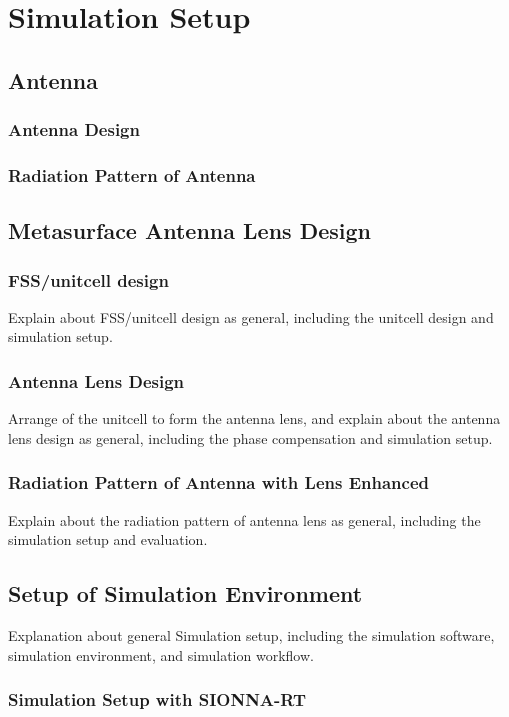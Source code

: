 \chapter{Simulation Setup}
\section{Antenna}
\subsection{Antenna Design}
\subsection{Radiation Pattern of Antenna}

\section{Metasurface Antenna Lens Design}
\subsection{FSS/unitcell design}
    Explain about FSS/unitcell design as general, including the unitcell design and simulation setup.
\subsection{Antenna Lens Design}
    Arrange of the unitcell to form the antenna lens, and explain about the antenna lens design as general, including the phase compensation and simulation setup.
\subsection{Radiation Pattern of Antenna with Lens Enhanced}
    Explain about the radiation pattern of antenna lens as general, including the simulation setup and evaluation.
\section{Setup of Simulation Environment}
    Explanation about general Simulation setup, including the simulation software, simulation environment, and simulation workflow.
    \subsection{Simulation Setup with SIONNA-RT}
